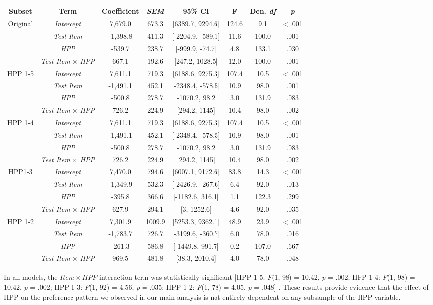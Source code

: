 \documentclass[english,man,man,floatsintext]{apa6}
\begin{document}
\begin{appendix}
\begin{longtable}[]{@{}cccccccc@{}}
\toprule
\textbf{Subset} & \textbf{Term} & \textbf{Coefficient} &
\textbf{\emph{SEM}} & \textbf{95\% CI} & \textbf{F} & \textbf{Den.
\emph{df}} & \textbf{\emph{p}}\tabularnewline
\midrule
\endhead
Original & \emph{Intercept} & 7,679.0 & 673.3 & {[}6389.7, 9294.6{]} &
124.6 & 9.1 & \textless{} .001\tabularnewline
& \emph{Test Item} & -1,398.8 & 411.3 & {[}-2204.9, -589.1{]} & 11.6 &
100.0 & .001\tabularnewline
& \emph{HPP} & -539.7 & 238.7 & {[}-999.9, -74.7{]} & 4.8 & 133.1 &
.030\tabularnewline
& \emph{Test Item \(\times\) HPP} & 667.1 & 192.6 & {[}247.2, 1028.5{]}
& 12.0 & 100.0 & .001\tabularnewline
HPP 1-5 & \emph{Intercept} & 7,611.1 & 719.3 & {[}6188.6, 9275.3{]} &
107.4 & 10.5 & \textless{} .001\tabularnewline
& \emph{Test Item} & -1,491.1 & 452.1 & {[}-2348.4, -578.5{]} & 10.9 &
98.0 & .001\tabularnewline
& \emph{HPP} & -500.8 & 278.7 & {[}-1070.2, 98.2{]} & 3.0 & 131.9 &
.083\tabularnewline
& \emph{Test Item \(\times\) HPP} & 726.2 & 224.9 & {[}294.2, 1145{]} &
10.4 & 98.0 & .002\tabularnewline
HPP 1-4 & \emph{Intercept} & 7,611.1 & 719.3 & {[}6188.6, 9275.3{]} &
107.4 & 10.5 & \textless{} .001\tabularnewline
& \emph{Test Item} & -1,491.1 & 452.1 & {[}-2348.4, -578.5{]} & 10.9 &
98.0 & .001\tabularnewline
& \emph{HPP} & -500.8 & 278.7 & {[}-1070.2, 98.2{]} & 3.0 & 131.9 &
.083\tabularnewline
& \emph{Test Item \(\times\) HPP} & 726.2 & 224.9 & {[}294.2, 1145{]} &
10.4 & 98.0 & .002\tabularnewline
HPP1-3 & \emph{Intercept} & 7,470.0 & 794.6 & {[}6007.1, 9172.6{]} &
83.8 & 14.3 & \textless{} .001\tabularnewline
& \emph{Test Item} & -1,349.9 & 532.3 & {[}-2426.9, -267.6{]} & 6.4 &
92.0 & .013\tabularnewline
& \emph{HPP} & -395.8 & 366.6 & {[}-1182.6, 316.1{]} & 1.1 & 122.3 &
.299\tabularnewline
& \emph{Test Item \(\times\) HPP} & 627.9 & 294.1 & {[}3, 1252.6{]} &
4.6 & 92.0 & .035\tabularnewline
HPP 1-2 & \emph{Intercept} & 7,301.9 & 1009.9 & {[}5253.3, 9362.1{]} &
48.9 & 23.9 & \textless{} .001\tabularnewline
& \emph{Test Item} & -1,783.7 & 726.7 & {[}-3199.6, -360.7{]} & 6.0 &
78.0 & .016\tabularnewline
& \emph{HPP} & -261.3 & 586.8 & {[}-1449.8, 991.7{]} & 0.2 & 107.0 &
.667\tabularnewline
& \emph{Test Item \(\times\) HPP} & 969.5 & 481.8 & {[}38.3, 2010.4{]} &
4.0 & 78.0 & .048\tabularnewline
\bottomrule
\end{longtable}

In all models, the \(Item \times HPP\) interaction term was
statistically significant {[}HPP 1-5: \emph{F}(1, 98) = 10.42, \emph{p}
= .002; HPP 1-4: \emph{F}(1, 98) = 10.42, \emph{p} = .002; HPP 1-3:
\emph{F}(1, 92) = 4.56, \emph{p} = .035; HPP 1-2: \emph{F}(1, 78) =
4.05, \emph{p} = .048{]} . These results provide evidence that the
effect of HPP on the preference pattern we observed in our main analysis
is not entirely dependent on any subsample of the HPP variable.


\end{appendix}
\end{document}
